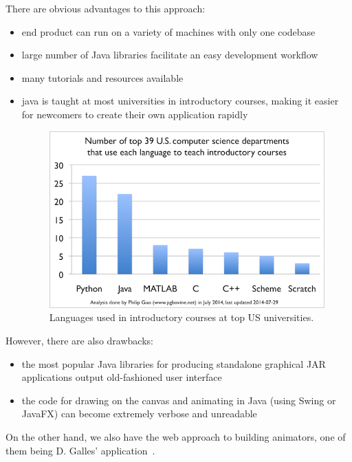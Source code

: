 \documentclass{l4proj}
\begin{document}
There are obvious advantages to this approach:
\begin{itemize}
	\item end product can run on a variety of machines with only one codebase
	\item large number of Java libraries facilitate an easy development workflow
    \item many tutorials and resources available
    \item java is taught at most universities in introductory courses, making it easier for newcomers to create their own application rapidly
    	\begin{figure}[!ht]
		\centering
		\includegraphics[scale=0.8]{java-uni}
		\caption{Languages used in introductory courses at top US universities.}
		\label{fig:java-uni}
		\end{figure}
\end{itemize}

\pagebreak

However, there are also drawbacks:
\begin{itemize}
\item the most popular Java libraries for producing standalone graphical JAR applications output old-fashioned user interface
\item the code for drawing on the canvas and animating in Java (using Swing or JavaFX) can become extremely verbose and unreadable
\end{itemize}

On the other hand, we also have the web approach to building animators, one of them being D. Galles' application~\cite{galles}.
\end{document}
